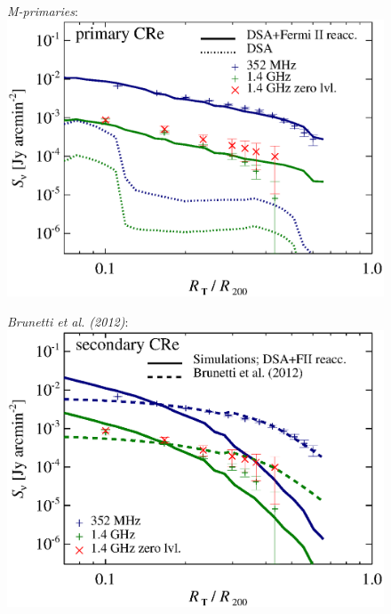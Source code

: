 \documentclass[useAMS,usenatbib]{mn2e}
\newcommand{\Mprimary}{{\it M-primaries}\xspace}
\begin{document}
\begin{figure}
\begin{minipage}{1\columnwidth}
\begin{center}
   \end{center}
\end{minipage}
\\
\begin{minipage}{1\columnwidth}
   \begin{center}\LARGE{\Mprimary:}\\
     \includegraphics[width=\columnwidth]{figures/sbright.nu.DIIcomp.Pri.g72a.Rad14.2400p.z0.NL.xKR.eb23.eI088.140.v5.halo.test5.eps}
   \end{center}
\end{minipage}
\begin{minipage}{1\columnwidth}
   \begin{center}\LARGE{\it Brunetti et al. (2012)}:\\
     \includegraphics[width=\columnwidth]{figures/sbright.nu.DIIcomp.Brunetti.g72a.Rad14.2400p.z0.NL.xKR.eb23.140.v5.halo.test5.eps}

\end{center}
\end{minipage}
\end{figure}
\end{document}
